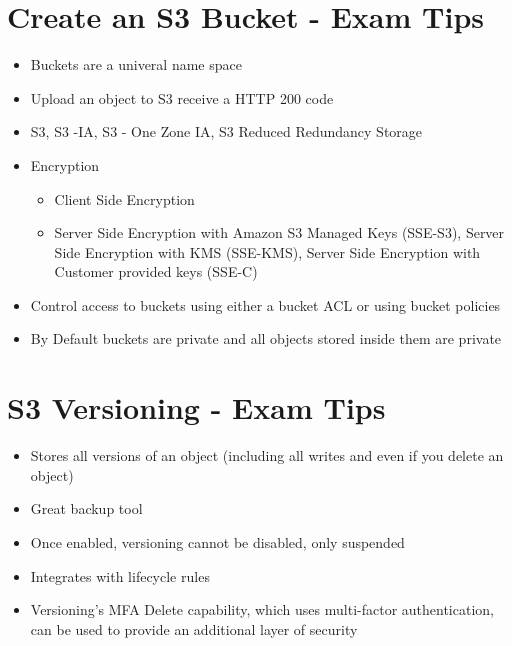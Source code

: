 \documentclass{article}
\begin{document}
\section{Create an S3 Bucket - Exam Tips}
\begin{itemize}
\item
Buckets are a univeral name space

\item
Upload an object to S3 receive a HTTP 200 code

\item
S3, S3 -IA, S3 - One Zone IA, S3 Reduced Redundancy Storage

\item
Encryption
	\begin{itemize}
	\item
	Client Side Encryption
	
	\item
	Server Side Encryption with Amazon S3 Managed Keys (SSE-S3), Server Side Encryption with KMS (SSE-KMS), Server Side Encryption with Customer provided keys (SSE-C)
	\end{itemize}

\item
Control access to buckets using either a bucket ACL or using bucket policies

\item
By Default buckets are private and all objects stored inside them are private

\end{itemize}

\section{S3 Versioning - Exam Tips}
\begin{itemize}
\item
Stores all versions of an object (including all writes and even if you delete an object)

\item
Great backup tool

\item
Once enabled, versioning cannot be disabled, only suspended

\item
Integrates with lifecycle rules

\item
Versioning's MFA Delete capability, which uses multi-factor authentication, can be used to provide an additional layer of security
\end{itemize}
\end{document}
